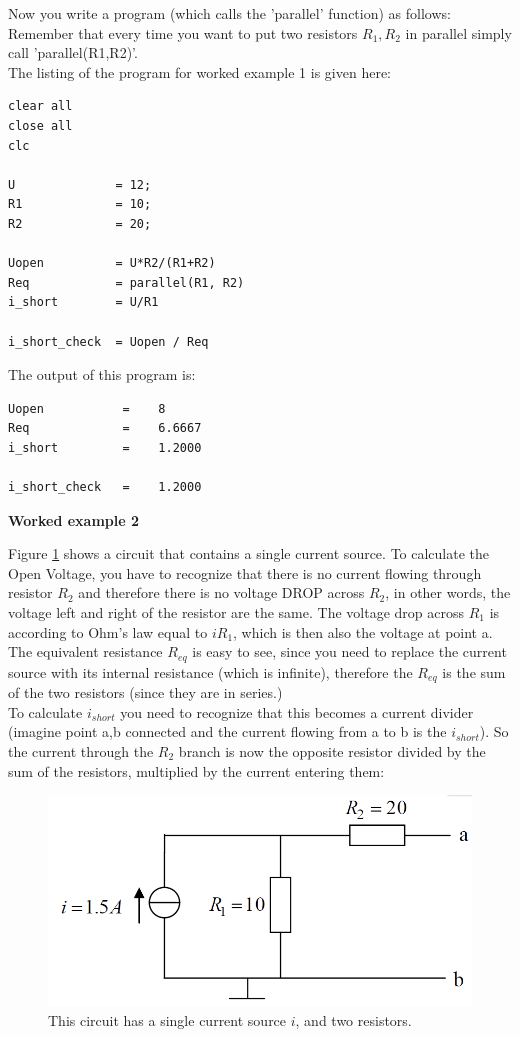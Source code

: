 \documentclass[11pt,letterpaper]{article}
\begin{document}
Now you write a program (which calls the 'parallel' function) as follows: Remember that every time you want to put two resistors $R_1, R_2$ in parallel simply call 'parallel(R1,R2)'.\\

\newpage
The listing of the program for worked example 1 is given here:

\begin{lstlisting}
clear all
close all
clc

U              = 12;
R1             = 10;
R2             = 20;

Uopen          = U*R2/(R1+R2)
Req            = parallel(R1, R2)
i_short        = U/R1

i_short_check  = Uopen / Req
\end{lstlisting}

The output of this program is:

\begin{lstlisting}
Uopen 			=    8
Req 			=    6.6667
i_short 		=    1.2000

i_short_check 	=    1.2000
\end{lstlisting}


\textbf{Worked example 2}

Figure \ref{fig:HW_Thevenin2} shows a circuit that contains a single current source. To calculate the Open Voltage, you have to recognize that there is no current flowing through resistor $R_2$ and therefore there is no voltage DROP across $R_2$, in other words, the voltage left and right of the resistor are the same. The voltage drop across $R_1$ is according to Ohm's law equal to $i R_1$, which is then also the voltage at point a.\\

The equivalent resistance $R_{eq}$ is easy to see, since you need to replace the current source with its internal resistance (which is infinite), therefore the $R_{eq}$ is the sum of the two resistors (since they are in series.)\\

To calculate $i_{short}$ you need to recognize that this becomes a current divider (imagine point a,b connected and the current flowing from a to b is the $i_{short}$). So the current through the $R_2$ branch is now the opposite resistor divided by the sum of the resistors, multiplied by the current entering them:

\begin{figure}
\centering
\includegraphics[width=0.65\linewidth]{HW_Thevenin2}
\caption{This circuit has a single current source $i$, and two resistors.}
\label{fig:HW_Thevenin2}
\end{figure}
\end{document}
